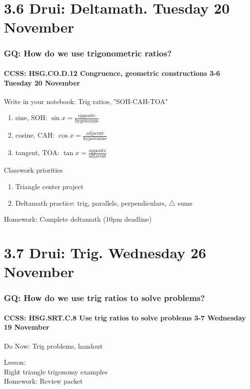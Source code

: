 \documentclass{beamer}
\begin{document}
    \section{3.6 Drui: Deltamath. Tuesday 20 November}
      \frame
      {
        \frametitle{GQ: How do we use trigonometric ratios?}
        \framesubtitle{CCSS: HSG.CO.D.12 Congruence, geometric constructions  \alert{3-6 Tuesday 20 November}}

        \begin{block}{Write in your notebook: Trig ratios, "SOH-CAH-TOA"}
        \begin{enumerate}
            \item sine, SOH: $\displaystyle \sin x = \frac{\text{opposite}} {\text{hypotenuse}}$
            \item cosine, CAH: $\displaystyle \cos x = \frac{\text{adjacent}} {\text{hypotenuse}}$
            \item tangent, TOA: $\displaystyle \tan x = \frac{\text{opposite}} {\text{adjacent}}$
        \end{enumerate}
        \end{block}
        Classwork priorities
        \begin{enumerate}
            \item  Triangle center project
            \item  Deltamath practice: trig, parallels, perpendiculars, $\triangle$ sums
        \end{enumerate}
        Homework: Complete deltamath (10pm deadline)
      }


    \section{3.7 Drui: Trig. Wednesday 26 November}
      \frame
      {
        \frametitle{GQ: How do we use trig ratios to solve problems?}
        \framesubtitle{CCSS: HSG.SRT.C.8 Use trig ratios to solve problems  \alert{3-7 Wednesday 19 November}}

        \begin{block}{Do Now: Trig problems, handout}
        \end{block}
        Lesson: \\
        Right triangle trigonomy examples\\[0.5cm]
        Homework: Review packet
      }
\end{document}
